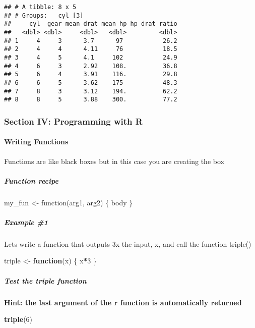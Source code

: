 \documentclass[]{article}
\newenvironment{Shaded}{\begin{snugshade}}{\end{snugshade}}
\newcommand{\KeywordTok}[1]{\textcolor[rgb]{0.13,0.29,0.53}{\textbf{#1}}}
\newcommand{\DecValTok}[1]{\textcolor[rgb]{0.00,0.00,0.81}{#1}}
\newcommand{\StringTok}[1]{\textcolor[rgb]{0.31,0.60,0.02}{#1}}
\newcommand{\ControlFlowTok}[1]{\textcolor[rgb]{0.13,0.29,0.53}{\textbf{#1}}}
\newcommand{\OperatorTok}[1]{\textcolor[rgb]{0.81,0.36,0.00}{\textbf{#1}}}
\newcommand{\NormalTok}[1]{#1}
\let\oldparagraph\paragraph
\renewcommand{\paragraph}[1]{\oldparagraph{#1}\mbox{}}
\let\oldsubparagraph\subparagraph
\renewcommand{\subparagraph}[1]{\oldsubparagraph{#1}\mbox{}}
\begin{document}
\begin{verbatim}
## # A tibble: 8 x 5
## # Groups:   cyl [3]
##     cyl  gear mean_drat mean_hp hp_drat_ratio
##   <dbl> <dbl>     <dbl>   <dbl>         <dbl>
## 1     4     3      3.7      97           26.2
## 2     4     4      4.11     76           18.5
## 3     4     5      4.1     102           24.9
## 4     6     3      2.92    108.          36.8
## 5     6     4      3.91    116.          29.8
## 6     6     5      3.62    175           48.3
## 7     8     3      3.12    194.          62.2
## 8     8     5      3.88    300.          77.2
\end{verbatim}

\subsubsection{Section IV: Programming with
R}\label{section-iv-programming-with-r}

\paragraph{Writing Functions}\label{writing-functions}

Functions are like black boxes but in this case you are creating the box

\subparagraph{Function recipe}\label{function-recipe}

my\_fun \textless{}- function(arg1, arg2) \{ body \}

\subparagraph{Example \#1}\label{example-1}

Lets write a function that outputs 3x the input, x, and call the
function triple()

\begin{Shaded}
\begin{Highlighting}[]
\NormalTok{triple <-}\StringTok{ }\ControlFlowTok{function}\NormalTok{(x) \{}
\NormalTok{  x}\OperatorTok{*}\DecValTok{3}
\NormalTok{\}}
\end{Highlighting}
\end{Shaded}

\subparagraph{Test the triple function}\label{test-the-triple-function}

\textbf{Hint: the last argument of the r function is automatically
returned}

\begin{Shaded}
\begin{Highlighting}[]
\KeywordTok{triple}\NormalTok{(}\DecValTok{6}\NormalTok{)}
\end{Highlighting}
\end{Shaded}
\end{document}
